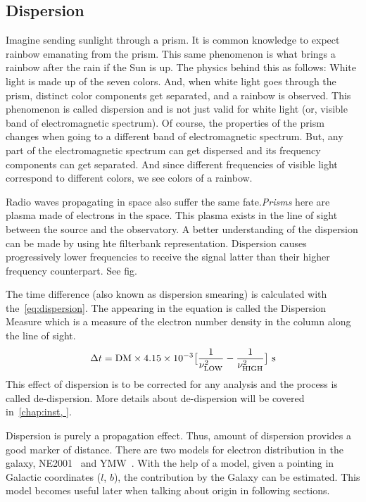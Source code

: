 \subsection{Dispersion}
\label{ssub:dis}

\par Imagine sending sunlight through a prism. It is common knowledge to expect rainbow emanating from the prism. 
This same phenomenon is what brings a rainbow after the rain if the Sun is up. The physics behind this as follows:
White light is made up of the seven colors. And, when white light goes through the prism, distinct color components get separated,
and a rainbow is observed. 
This phenomenon is called dispersion and is not just valid for white light (or, visible band of electromagnetic spectrum). 
Of course, the properties of the prism changes when going to a different band of electromagnetic spectrum. But, any part of the electromagnetic spectrum can get dispersed and its frequency components can get separated. And since different frequencies of visible light correspond to different colors, we see colors of a rainbow.

\par Radio waves propagating in space also suffer the same fate.\emph{Prisms} here are plasma made of electrons in the space. 
This plasma exists in the line of sight between the source and the observatory. A better understanding of the dispersion can be made by using hte filterbank representation. Dispersion causes progressively lower frequencies to receive the signal latter than their higher frequency counterpart. See fig.

\par The time difference (also known as dispersion smearing) is calculated with the~\ref{eq:dispersion}. The \dm appearing in the equation is called the Dispersion Measure which is a measure of the electron number density in the column along the line of sight.
\begin{equation}
\label{eq:dispersion}
\Delta t = {\rm DM} \times 4.15 \times 10^{-3} \big[  \frac{1}{\nu^2_{\rm LOW}} - \frac{1}{\nu^2_{\rm HIGH}} \big]\ {\rm s}
\end{equation}
This effect of dispersion is to be corrected for any analysis and the process is called de-dispersion. More details about de-dispersion will be covered in~\autoref{chap:inst, }.

\par Dispersion is purely a propagation effect. Thus, amount of dispersion provides a good marker of distance. There are two models for electron distribution in the galaxy, NE2001~\cite{ne2001} and YMW~\cite{ymw16}. With the help of a model, given a pointing in Galactic coordinates ($l$, $b$), the \dm contribution by the Galaxy can be estimated. This model becomes useful later when talking about \frb{} origin in following sections. 

